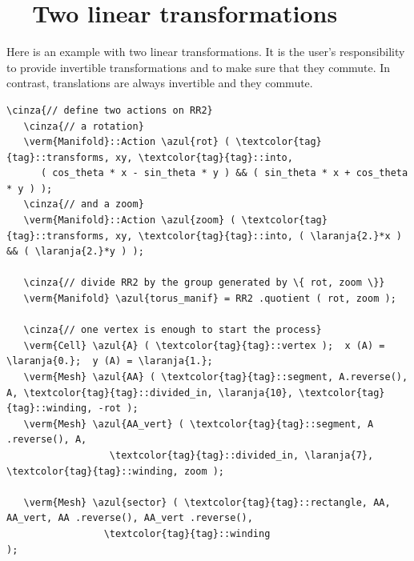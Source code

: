 \section{~~Two linear transformations}\label{\numb section 7.\numb parag 18}

Here is an example with two linear transformations.
It is the user's responsibility to provide invertible transformations and
to make sure that they commute.
In contrast, translations are always invertible and they commute.

\begin{Verbatim}[commandchars=\\\{\},formatcom=\small\tt,frame=single,
   label=parag-\ref{\numb section 7.\numb parag 18}.cpp,rulecolor=\color{moldura},
   baselinestretch=0.94,framesep=2mm                                             ]
   \cinza{// define two actions on RR2}
   \cinza{// a rotation}
   \verm{Manifold}::Action \azul{rot} ( \textcolor{tag}{tag}::transforms, xy, \textcolor{tag}{tag}::into,
      ( cos_theta * x - sin_theta * y ) && ( sin_theta * x + cos_theta * y ) );
   \cinza{// and a zoom}
   \verm{Manifold}::Action \azul{zoom} ( \textcolor{tag}{tag}::transforms, xy, \textcolor{tag}{tag}::into, ( \laranja{2.}*x ) && ( \laranja{2.}*y ) );

   \cinza{// divide RR2 by the group generated by \{ rot, zoom \}}
   \verm{Manifold} \azul{torus_manif} = RR2 .quotient ( rot, zoom );

   \cinza{// one vertex is enough to start the process}
   \verm{Cell} \azul{A} ( \textcolor{tag}{tag}::vertex );  x (A) = \laranja{0.};  y (A) = \laranja{1.};
   \verm{Mesh} \azul{AA} ( \textcolor{tag}{tag}::segment, A.reverse(), A, \textcolor{tag}{tag}::divided_in, \laranja{10}, \textcolor{tag}{tag}::winding, -rot );
   \verm{Mesh} \azul{AA_vert} ( \textcolor{tag}{tag}::segment, A .reverse(), A,
                  \textcolor{tag}{tag}::divided_in, \laranja{7}, \textcolor{tag}{tag}::winding, zoom );

   \verm{Mesh} \azul{sector} ( \textcolor{tag}{tag}::rectangle, AA, AA_vert, AA .reverse(), AA_vert .reverse(),
                 \textcolor{tag}{tag}::winding                                                   );
\end{Verbatim}
  
